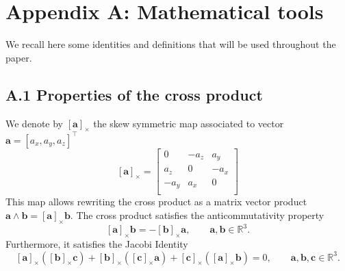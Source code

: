 \documentclass{svjour3}                     %
\newcommand{\crmat}[1]{\ensuremath{[#1]_{\times}}}
\begin{document}
\section*{Appendix A: Mathematical tools}
We recall here some identities and definitions that will be used throughout the paper. 
\subsection*{\normalsize \textbf{A.1 Properties of the cross product}}
We denote by $\crmat{\bm{a}}$ the skew symmetric map associated to vector $\bm{a} = [a_x, a_y, a_z]^\top$
\begin{equation}
\crmat{\bm{a}} = 
\begin{bmatrix}
0 & -a_z & a_y \\
a_z & 0 & -a_x \\
-a_y & a_x & 0 \\
\end{bmatrix}
\end{equation}
This map allows rewriting the cross product as a matrix vector product $\bm{a}\wedge \bm{b} = \crmat{\bm{a}}\bm{b}$. The cross product satisfies the anticommutativity property
\begin{equation}
\label{eq:anticom}
\crmat{\bm{a}} \bm{b} = - \crmat{\bm{b}} \bm{a}, \qquad \bm{a}, \bm{b} \in \mathbb{R}^3.
\end{equation}
Furthermore, it satisfies the Jacobi Identity
\begin{equation}
\label{eq:jacobi}
\crmat{\bm{a}} (\crmat{\bm{b}} \bm{c}) + \crmat{\bm{b}} (\crmat{\bm{c}} \bm{a}) + \crmat{\bm{c}} (\crmat{\bm{a}} \bm{b}) = 0, \qquad \bm{a}, \bm{b}, \bm{c} \in \mathbb{R}^3.
\end{equation}
\end{document}
